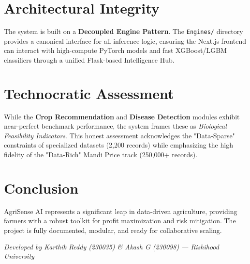 \documentclass[11pt,a4paper]{article}
\begin{document}
\section{Architectural Integrity}
The system is built on a \textbf{Decoupled Engine Pattern}. The \texttt{Engines/} directory provides a canonical interface for all inference logic, ensuring the Next.js frontend can interact with high-compute PyTorch models and fast XGBoost/LGBM classifiers through a unified Flask-based Intelligence Hub.

\section{Technocratic Assessment}
While the \textbf{Crop Recommendation} and \textbf{Disease Detection} modules exhibit near-perfect benchmark performance, the system frames these as \textit{Biological Feasibility Indicators}. This honest assessment acknowledges the "Data-Sparse" constraints of specialized datasets (2,200 records) while emphasizing the high fidelity of the "Data-Rich" Mandi Price track (250,000+ records).

\section{Conclusion}
AgriSense AI represents a significant leap in data-driven agriculture, providing farmers with a robust toolkit for profit maximization and risk mitigation. The project is fully documented, modular, and ready for collaborative scaling.

\vfill
\begin{center}
    \textit{Developed by Karthik Reddy (230035) \& Akash G (230098) --- Rishihood University}
\end{center}
\end{document}
